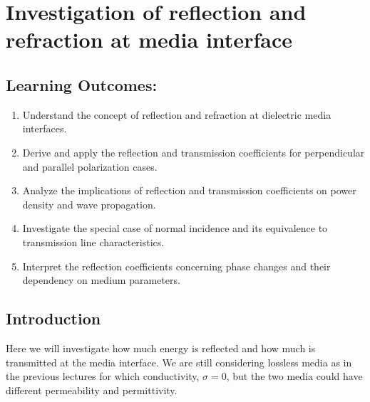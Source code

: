 \chapter{Investigation of reflection and refraction at media interface}\label{lec:lec31}

\section{Learning Outcomes:}
\begin{mdframed}[backgroundcolor=lightblue, linewidth=1pt, hidealllines=true]
    \begin{enumerate}[label=\roman*., itemsep=0pt, topsep=0pt]
        \item Understand the concept of reflection and refraction at dielectric media interfaces.
        \item Derive and apply the reflection and transmission coefficients for perpendicular and parallel polarization cases.
        \item Analyze the implications of reflection and transmission coefficients on power density and wave propagation.
        \item Investigate the special case of normal incidence and its equivalence to transmission line characteristics.
        \item Interpret the reflection coefficients concerning phase changes and their dependency on medium parameters.
    \end{enumerate}
\end{mdframed}

\section{Introduction}

Here we will investigate how much energy is reflected and how much is transmitted at the media interface. We are still considering lossless media as in the previous lectures for which conductivity, $ \sigma = 0$, but the two media could have different permeability and permittivity.

